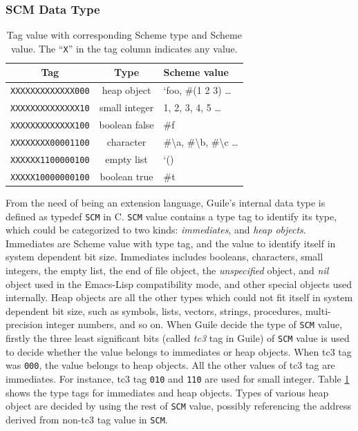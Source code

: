 \documentclass[preprint, numbers]{sigplanconf}
\begin{document}

\subsubsection{SCM Data Type}
\begin{table}
  \centering
  \begin{tabular}{ccl}
    \toprule
    Tag&Type&Scheme value\\
    \midrule
    \texttt{XXXXXXXXXXXXX000} & heap object & `foo, \#(1 2 3) \ldots \\
    \texttt{XXXXXXXXXXXXXX10} & small integer & 1, 2, 3, 4, 5 \ldots \\
    \texttt{XXXXXXXXXXXXX100} & boolean false & \#f \\
    \texttt{XXXXXXXX00001100} & character & \#\textbackslash a, \#\textbackslash b,
    \#\textbackslash c \ldots \\ %
    \texttt{XXXXXX1100000100} & empty list & `() \\ %
    \texttt{XXXXX10000000100} & boolean true & \#t \\
    \bottomrule
  \end{tabular}
  \caption{Tag value with corresponding Scheme type and Scheme value. The
    ``\texttt{X}'' in the tag column indicates any value.}
\label{tab:tags}
\end{table}

From the need of being an extension language, Guile's internal data type is
defined as typedef \texttt{SCM} in C\cite{guileref}. \texttt{SCM} value
contains a type tag to identify its type, which could be categorized to two
kinds: \textit{immediates}, and \textit{heap objects}. Immediates are Scheme
value with type tag, and the value to identify itself in system dependent bit
size. Immediates includes booleans, characters, small integers, the empty
list, the end of file object, the \textit{unspecified} object, and
\textit{nil} object used in the Emacs-Lisp compatibility mode, and other
special objects used internally. Heap objects are all the other types which
could not fit itself in system dependent bit size, such as symbols, lists,
vectors, strings, procedures, multi-precision integer numbers, and so on.
When Guile decide the type of \texttt{SCM} value, firstly the three least
significant bits (called \textit{tc3} tag in Guile) of \texttt{SCM} value is
used to decide whether the value belongs to immediates or heap objects. When
tc3 tag was \texttt{000}, the value belongs to heap objects. All the other
values of tc3 tag are immediates. For instance, tc3 tag \texttt{010} and
\texttt{110} are used for small integer. Table
\hyperref[tab:tags]{\ref{tab:tags}} shows the type tags for immediates and
heap objects. Types of various heap object are decided by using the rest of
\texttt{SCM} value, possibly referencing the address derived from non-tc3
tag value in \texttt{SCM}.
\end{document}
